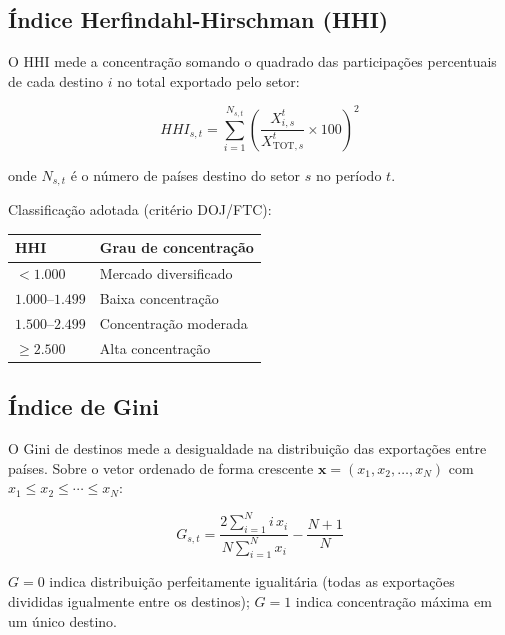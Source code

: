 \documentclass[12pt, a4paper]{article}
\begin{document}
\subsection{Índice Herfindahl-Hirschman (HHI)}

O HHI mede a concentração somando o quadrado das participações percentuais
de cada destino \(i\) no total exportado pelo setor:

\begin{equation}
  \boxed{
    HHI_{s,t} = \sum_{i=1}^{N_{s,t}}
      \left(\frac{X_{i,s}^{t}}{X_{\text{TOT},s}^{t}} \times 100\right)^{2}
  }
  \label{eq:hhi}
\end{equation}

onde $N_{s,t}$ é o número de países destino do setor $s$ no período $t$.

\noindent Classificação adotada (critério DOJ/FTC):

\begin{center}
\renewcommand{\arraystretch}{1.2}
\begin{tabular}{ll}
\toprule
\textbf{HHI} & \textbf{Grau de concentração} \\
\midrule
$< 1.000$    & Mercado diversificado \\
$1.000$--$1.499$ & Baixa concentração \\
$1.500$--$2.499$ & Concentração moderada \\
$\geq 2.500$ & Alta concentração \\
\bottomrule
\end{tabular}
\end{center}

\subsection{Índice de Gini}

O Gini de destinos mede a desigualdade na distribuição das exportações
entre países. Sobre o vetor ordenado de forma crescente
$\mathbf{x} = (x_1, x_2, \dots, x_N)$ com $x_1 \leq x_2 \leq \cdots \leq x_N$:

\begin{equation}
  \boxed{
    G_{s,t} = \frac{2 \displaystyle\sum_{i=1}^{N} i\, x_i}
                   {N \displaystyle\sum_{i=1}^{N} x_i}
               - \frac{N+1}{N}
  }
  \label{eq:gini}
\end{equation}

$G = 0$ indica distribuição perfeitamente igualitária (todas as exportações
divididas igualmente entre os destinos); $G = 1$ indica concentração
máxima em um único destino.
\end{document}
